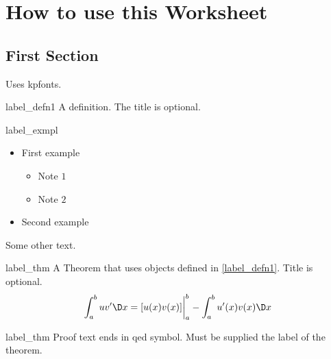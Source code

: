 \chapter{How to use this Worksheet}

\section{First Section}

Uses kpfonts.

\begin{defn}{label_defn1}
	A definition. The title is optional.
\end{defn}



\begin{exmpl}[Title]{label_exmpl}
	\begin{itemize}
		\item First example 
		\begin{itemize}
			\item  Note $1$
			\item  Note $2$
		\end{itemize}
		\item Second example
	\end{itemize}
\end{exmpl}    



Some other text.

\begin{theo}{label_thm}
	A Theorem that uses objects defined in \cref{label_defn1}. Title is optional. 
	\[\dint_a^b u v' \dx = [u(x)v(x)] \eval_a^b - \dint_a^b u'(x) v(x) \dx\]
\end{theo}


\begin{prf}{label_thm}
	Proof text ends in qed symbol. Must be supplied the label of the theorem.
\end{prf}




